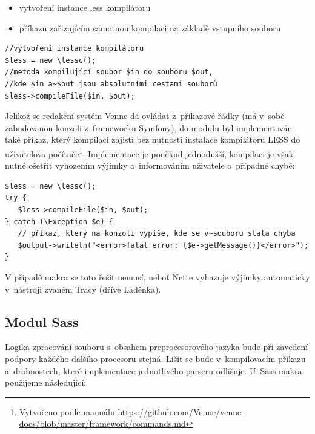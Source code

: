 \documentclass[thesis=B,czech]{FITthesis}[2012/06/26]
\begin{document}
\begin{itemize}
 \item vytvoření instance less kompilátoru
 \item příkazu zařizujícím samotnou kompilaci na základě vstupního souboru
\end{itemize}
\scriptsize
\begin{verbatim}
//vytvoření instance kompilátoru
$less = new \lessc(); 
//metoda kompilující soubor $in do souboru $out, 
//kde $in a~$out jsou absolutními cestami souborů
$less->compileFile($in, $out); 
\end{verbatim}
\normalsize
Jelikož se redakční systém Venne dá ovládat z~příkazové řádky (má v~sobě zabudovanou konzoli z~frameworku Symfony), do modulu byl implementován také příkaz, který kompilaci zajistí bez nutnosti instalace kompilátoru LESS do uživatelova počítače\footnote{Vytvořeno podle manuálu \url{https://github.com/Venne/venne-docs/blob/master/framework/commands.md}}. Implementace je poněkud jednodušší, kompilaci je však nutné ošetřit vyhozením výjimky a~informováním uživatele o~případné chybě:
\scriptsize
\begin{verbatim}
$less = new \lessc();
try {
   $less->compileFile($in, $out);
} catch (\Exception $e) {
   // příkaz, který na konzoli vypíše, kde se v~souboru stala chyba
   $output->writeln("<error>fatal error: {$e->getMessage()}</error>"); 
}
\end{verbatim}
\normalsize
V případě makra se toto řešit nemusí, neboť Nette vyhazuje výjimky automaticky v~nástroji zvaném Tracy (dříve Laděnka).



\subsection{Modul Sass}

Logika zpracování souboru s~obsahem preprocesorového jazyka bude při zavedení podpory každého dalšího procesoru stejná. Lišit se bude v~kompilovacím příkazu a~drobnostech, které implementace jednotlivého parseru odlišuje. U~\gls{Sass} makra použijeme následující:	
\end{document}
